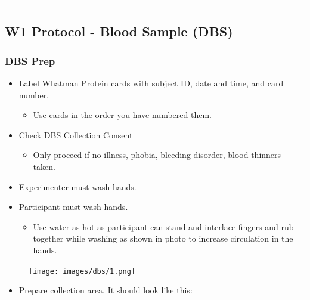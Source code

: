 \documentclass[
]{book}
\providecommand{\tightlist}{%
  \setlength{\itemsep}{0pt}\setlength{\parskip}{0pt}}
\begin{document}
\begin{center}\rule{0.5\linewidth}{0.5pt}\end{center}

\hypertarget{w1-protocol---blood-sample-dbs}{%
\subsection{W1 Protocol - Blood Sample (DBS)}\label{w1-protocol---blood-sample-dbs}}

\hypertarget{dbs-prep}{%
\subsubsection{DBS Prep}\label{dbs-prep}}

\begin{itemize}
\tightlist
\item
  Label Whatman Protein cards with subject ID, date and time, and card number.

  \begin{itemize}
  \tightlist
  \item
    Use cards in the order you have numbered them.
  \end{itemize}
\item
  Check DBS Collection Consent

  \begin{itemize}
  \tightlist
  \item
    Only proceed if no illness, phobia, bleeding disorder, blood thinners taken.
  \end{itemize}
\item
  Experimenter must wash hands.
\item
  Participant must wash hands.

  \begin{itemize}
  \tightlist
  \item
    Use water as hot as participant can stand and interlace fingers and rub together while washing as shown in photo to increase circulation in the hands.
  \end{itemize}
\end{itemize}

\begin{figure}
\centering
\texttt{[image: images/dbs/1.png]}
\caption{}
\end{figure}

\begin{itemize}
\tightlist
\item
  Prepare collection area. It should look like this:
\end{itemize}
\end{document}
